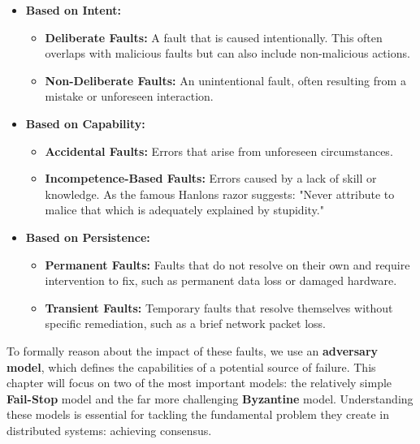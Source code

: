 \documentclass{scrbook}
\begin{document}
\begin{itemize}
  \begin{itemize}
  \item
    \textbf{Malicious Faults:} Faults caused with the explicit goal of
    disrupting the system, as in a deliberate attack.
  \item
    \textbf{Non-Malicious Faults:} Faults that occur without harmful
    intent, such as an accidental misconfiguration.
  \end{itemize}
\item
  \textbf{Based on Intent:}

  \begin{itemize}
  \item
    \textbf{Deliberate Faults:} A fault that is caused intentionally.
    This often overlaps with malicious faults but can also include
    non-malicious actions.
  \item
    \textbf{Non-Deliberate Faults:} An unintentional fault, often
    resulting from a mistake or unforeseen interaction.
  \end{itemize}
\item
  \textbf{Based on Capability:}

  \begin{itemize}
  \item
    \textbf{Accidental Faults:} Errors that arise from unforeseen
    circumstances.
  \item
    \textbf{Incompetence-Based Faults:} Errors caused by a lack of skill
    or knowledge. As the famous Hanlon\textquotesingle s razor suggests:
    "Never attribute to malice that which is adequately explained by
    stupidity."
  \end{itemize}
\item
  \textbf{Based on Persistence:}

  \begin{itemize}
  \item
    \textbf{Permanent Faults:} Faults that do not resolve on their own
    and require intervention to fix, such as permanent data loss or
    damaged hardware.
  \item
    \textbf{Transient Faults:} Temporary faults that resolve themselves
    without specific remediation, such as a brief network packet loss.
  \end{itemize}
\end{itemize}

To formally reason about the impact of these faults, we use an
\textbf{adversary model}, which defines the capabilities of a potential
source of failure. This chapter will focus on two of the most important
models: the relatively simple \textbf{Fail-Stop} model and the far more
challenging \textbf{Byzantine} model. Understanding these models is
essential for tackling the fundamental problem they create in
distributed systems: achieving consensus.
\end{document}
